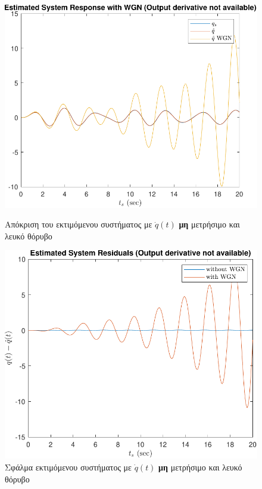 \documentclass[a4paper,12pt]{article}
\begin{document}
\begin{figure}[!h]
    \centering
    \begin{minipage}{0.45\textwidth}
        \centering
        \includegraphics[width=\linewidth]{plot/task3_response_without_derivative_WGN.pdf}
        \caption{Απόκριση του εκτιμόμενου συστήματος με $\dot{q}(t)$ \textbf{μη} μετρήσιμο και λευκό θόρυβο}
        \label{fig:task3_response_without_derivative_WGN}
    \end{minipage}
    \hfill
    \begin{minipage}{0.45\textwidth}
        \centering
        \includegraphics[width=\linewidth]{plot/task3_residuals_without_derivative_WGN.pdf}
        \caption{Σφάλμα εκτιμόμενου συστήματος με $\dot{q}(t)$ \textbf{μη} μετρήσιμο και λευκό θόρυβο}
        \label{fig:task3_residuals_without_derivative_WGN}
    \end{minipage}
\end{figure}
\end{document}
